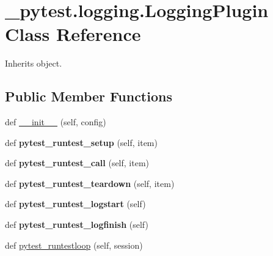 \hypertarget{class__pytest_1_1logging_1_1_logging_plugin}{}\section{\+\_\+pytest.\+logging.\+Logging\+Plugin Class Reference}
\label{class__pytest_1_1logging_1_1_logging_plugin}


Inherits object.

\subsection*{Public Member Functions}
\begin{DoxyCompactItemize}
\item 
def \hyperlink{class__pytest_1_1logging_1_1_logging_plugin_a4c26345ad1cfaeb2a7cff71e3fda6f8e}{\+\_\+\+\_\+init\+\_\+\+\_\+} (self, config)
\item 
\mbox{\label{class__pytest_1_1logging_1_1_logging_plugin_a361eac4cdada392b6f536e3651642f5b}} 
def {\bfseries pytest\+\_\+runtest\+\_\+setup} (self, item)
\item 
\mbox{\label{class__pytest_1_1logging_1_1_logging_plugin_acbf518ff25a5e468368dd4d09405c698}} 
def {\bfseries pytest\+\_\+runtest\+\_\+call} (self, item)
\item 
\mbox{\label{class__pytest_1_1logging_1_1_logging_plugin_aef4774a77221aae09ac801506d96ca85}} 
def {\bfseries pytest\+\_\+runtest\+\_\+teardown} (self, item)
\item 
\mbox{\label{class__pytest_1_1logging_1_1_logging_plugin_af7a576528cc1acf8bdcd2bb1c8f13c87}} 
def {\bfseries pytest\+\_\+runtest\+\_\+logstart} (self)
\item 
\mbox{\label{class__pytest_1_1logging_1_1_logging_plugin_aff204077eca1017da91d319f78a8ce7e}} 
def {\bfseries pytest\+\_\+runtest\+\_\+logfinish} (self)
\item 
def \hyperlink{class__pytest_1_1logging_1_1_logging_plugin_aa8eeb7ee732f1ba9dccf1d1551448044}{pytest\+\_\+runtestloop} (self, session)
\end{DoxyCompactItemize}
